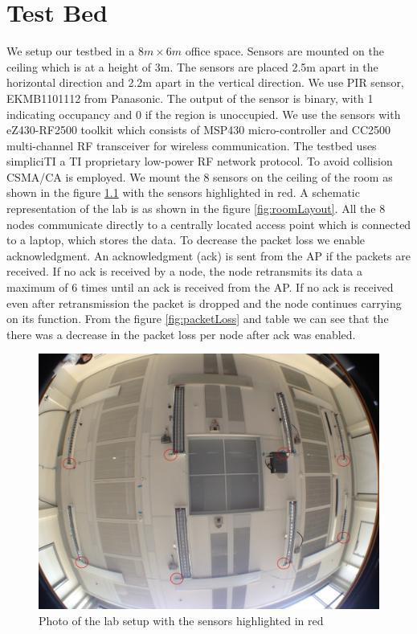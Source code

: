 \chapter{Test Bed}
\label{chp:testbed}

We setup our testbed in a $8m\times6m$ office space. Sensors are mounted on the ceiling which is at a height of 3m. The sensors are  placed 2.5m apart in the horizontal direction and 2.2m apart in the vertical direction. We use  PIR sensor, EKMB1101112 from Panasonic. 
The output of the sensor is binary, with 1 indicating occupancy and 0 if the region is unoccupied.  We use the sensors with eZ430-RF2500 toolkit which consists of MSP430 micro-controller  and CC2500 multi-channel
RF transceiver for wireless communication. The testbed uses simpliciTI a TI proprietary  low-power RF network protocol. To avoid collision CSMA/CA is employed. We mount the 8 sensors on the ceiling of the room as shown in the figure \ref{fig:photo} with the sensors highlighted in red. A schematic representation of the lab is as shown in the figure \ref{fig:roomLayout}. All the 8 nodes communicate directly to a centrally located access point which is connected to a laptop, which stores the data.
To decrease the packet loss we enable acknowledgment. An acknowledgment (ack) is sent from the AP if the packets are received. If no ack is received by a node, the node retransmits its data a maximum of 6 times until an ack is  received from the AP. If no ack is received even after retransmission the packet is dropped and the node continues carrying on its function. From the figure \ref{fig:packetLoss} and table we can see that the there was a decrease in the packet loss per node after ack was enabled. 
\begin{figure}[!ht]
\includegraphics[scale=0.5]{./pics/lab_photo.jpg}
\caption{Photo of the lab setup with the sensors highlighted in red}
\label{fig:photo}
\end{figure}
